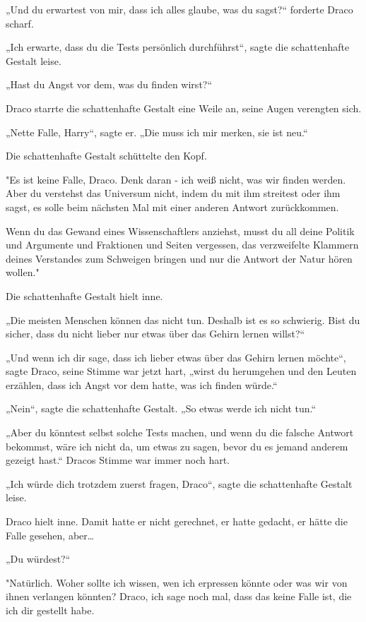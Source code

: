 {„Und du erwartest von mir, dass ich alles glaube, was du sagst?“ forderte Draco scharf.

„Ich erwarte, dass du die Tests persönlich durchführst“, sagte die schattenhafte Gestalt leise.

„Hast du Angst vor dem, was du finden wirst?“

Draco starrte die schattenhafte Gestalt eine Weile an, seine Augen verengten sich.

„Nette Falle, Harry“, sagte er. „Die muss ich mir merken, sie ist neu.“

Die schattenhafte Gestalt schüttelte den Kopf.

"Es ist keine Falle, Draco. Denk daran - ich weiß nicht, was wir finden werden. Aber du verstehst das Universum nicht, indem du mit ihm streitest oder ihm sagst, es solle beim nächsten Mal mit einer anderen Antwort zurückkommen.

Wenn du das Gewand eines Wissenschaftlers anziehst, musst du all deine Politik und Argumente und Fraktionen und Seiten vergessen, das verzweifelte Klammern deines Verstandes zum Schweigen bringen und nur die Antwort der Natur hören wollen."

Die schattenhafte Gestalt hielt inne.

„Die meisten Menschen können das nicht tun. Deshalb ist es so schwierig. Bist du sicher, dass du nicht lieber nur etwas über das Gehirn lernen willst?“

„Und wenn ich dir sage, dass ich lieber etwas über das Gehirn lernen möchte“, sagte Draco, seine Stimme war jetzt hart, „wirst du herumgehen und den Leuten erzählen, dass ich Angst vor dem hatte, was ich finden würde.“

„Nein“, sagte die schattenhafte Gestalt. „So etwas werde ich nicht tun.“

„Aber du könntest selbst solche Tests machen, und wenn du die falsche Antwort bekommst, wäre ich nicht da, um etwas zu sagen, bevor du es jemand anderem gezeigt hast.“ Dracos Stimme war immer noch hart.

„Ich würde dich trotzdem zuerst fragen, Draco“, sagte die schattenhafte Gestalt leise.

Draco hielt inne. Damit hatte er nicht gerechnet, er hatte gedacht, er hätte die Falle gesehen, aber…

„Du würdest?“

"Natürlich. Woher sollte ich wissen, wen ich erpressen könnte oder was wir von ihnen verlangen könnten? Draco, ich sage noch mal, dass das keine Falle ist, die ich dir gestellt habe.

}
